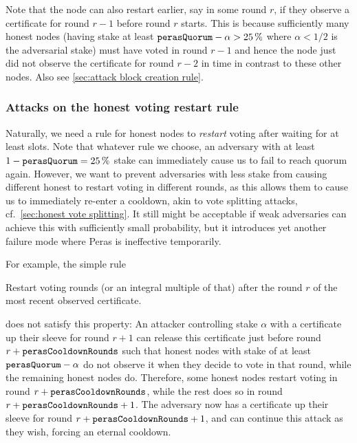 Note that the node can also restart earlier, say in some round $r$, if they observe a certificate for round $r-1$ before round $r$ starts.
This is because sufficiently many honest nodes (having stake at least $\mathtt{perasQuorum} - \alpha > \qty{25}{\percent}$ where $\alpha<1/2$ is the adversarial stake) must have voted in round $r-1$ and hence the node just did not observe the certificate for round $r-2$ in time in contrast to these other nodes.
Also see \cref{sec:attack block creation rule}.

\subsubsection{Attacks on the honest voting restart rule}

Naturally, we need a rule for honest nodes to \emph{restart} voting after waiting for at least \Theal{} slots.
Note that whatever rule we choose, an adversary with at least $1-\mathtt{perasQuorum} = \qty{25}{\percent}$ stake can immediately cause us to fail to reach quorum again.
However, we want to prevent adversaries with less stake from causing different honest to restart voting in different rounds, as this allows them to cause us to immediately re-enter a cooldown, akin to vote splitting attacks, cf.~\cref{sec:honest vote splitting}.
It still might be acceptable if weak adversaries can achieve this with sufficiently small probability, but it introduces yet another failure mode where Peras is ineffective temporarily.

For example, the simple rule
\begin{tcolorbox}
  Restart voting \perasCooldownRounds{} rounds (or an integral multiple of that) after the round $r$ of the most recent observed certificate.
\end{tcolorbox}
\parindent0pt
does not satisfy this property:
An attacker controlling stake $\alpha$ with a certificate up their sleeve for round $r+1$ can release this certificate just before round $r+\mathtt{perasCooldownRounds}$ such that honest nodes with stake of at least $\mathtt{perasQuorum} - \alpha$ do not observe it when they decide to vote in that round, while the remaining honest nodes do.
Therefore, some honest nodes restart voting in round $r+\mathtt{perasCooldownRounds}$, while the rest does so in round $r+\mathtt{perasCooldownRounds}+1$.
The adversary now has a certificate up their sleeve for round $r+\mathtt{perasCooldownRounds}+1$, and can continue this attack as they wish, forcing an eternal cooldown.

